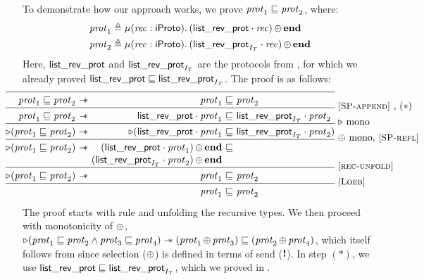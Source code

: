 To demonstrate how our approach works, we prove $\mathit{prot}_1 \sqsubseteq \mathit{prot}_2$,
where:
\begin{align*}
\prot_1 \eqdef{}&
  \MU (\recvar:\iProto). \selectprot {(\protapp \listrevprotname \recvar)} \protend \\
\prot_2 \eqdef{}&
  \MU (\recvar:\iProto). \selectprot {(\protapp {\listrevprotname_{\interpvar_\tvar}} \recvar)} \protend
\end{align*}
Here, $\mathsf{list\_rev\_prot}$ and $\mathsf{list\_rev\_prot}_{I_T}$ are the
protocols from , for which we already
proved $\mathsf{list\_rev\_prot} \sqsubseteq \mathsf{list\_rev\_prot}_{I_T}$.
The proof is as follows:
%
\[
\def\arraystretch{1.3}
\hspace{-6em}
\begin{array}{@{} r @{\ } c @{\ } r @{\ } c @{\ } l @{} l @{}}
  \hline
  \subprot {\prot_1} {\prot_2} & \wand &
  \subprot {\prot_1 &} {&\prot_2}
  & \linetext{\ruleref{SP-append}, $(*)$} \\ \hline
  \subprot {\prot_1} {\prot_2} & \wand &
  \subprot
    {\protapp \listrevprotname {\prot_1} &}
    {& \protapp {\listrevprotname_{\interpvar_\tvar}} {\prot_2}}
    & \linetext{$\later$ mono} \\ \hline

  \later (\subprot {\prot_1} {\prot_2}) & \wand  &
  \later (\subprot
    {\protapp \listrevprotname {\prot_1} &}
    {& \protapp {\listrevprotname_{\interpvar_\tvar}} {\prot_2}})
  & \linetext{$\selectop$ mono, \ruleref{SP-refl}} \\ \hline
  \later (\subprot { \prot_1} {\prot_2 }) & \wand &
  \subprot
    {\selectprot {(\protapp \listrevprotname {\prot_1})} \protend &}
    {\\[-0.3em] && \selectprot {(\protapp {\listrevprotname_{\interpvar_\tvar}} {\prot_2})} \protend}
  &&& \linetext{\ruleref{rec-unfold}} \\ \hline
  \later (\subprot {\prot_1} {\prot_2}) & \wand &
    \subprot {\prot_1 &} {& \prot_2}
  & \linetext{\ruleref{Loeb}} \\ \hline
  && \subprot {\prot_1 &} {& \prot_2}
\end{array}
\]
%
The proof starts with rule  and unfolding the recursive
types.
We then proceed with monotonicity of $\mathop{\oplus}$, \ie
$\mathop{{\triangleright}} (\mathit{prot}_1 \sqsubseteq \mathit{prot}_2 \land \mathit{prot}_3 \sqsubseteq \mathit{prot}_4)
\mathrel{-\!\!\ast} (\mathit{prot}_1 \mathop{\oplus} \mathit{prot}_3) \sqsubseteq (\mathit{prot}_2 \mathop{\oplus} \mathit{prot}_4)$,
which itself follows from  since selection ($\mathop{\oplus}$)
is defined in terms of send ($\textnormal{\bf !}$).
In step $(*)$, we use $\mathsf{list\_rev\_prot} \sqsubseteq \mathsf{list\_rev\_prot}_{I_T}$,
which we proved in .

